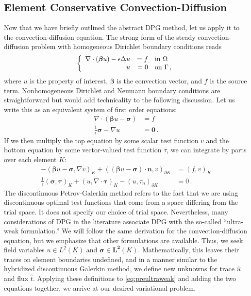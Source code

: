 \documentclass[letterpaper]{article}
\def\btau{\boldsymbol\tau}
\def\bsigma{\boldsymbol\sigma}
\def\bbeta{\boldsymbol\beta}
\newcommand{\bs}[1]{\boldsymbol{#1}}
\newcommand{\eqnref}[1]{\eqref{eq:#1}}
\newcommand{\mb}[1]{\mathbf{#1}}
\newcommand{\del}{\Delta}
\newcommand{\grad}{\nabla}
\renewcommand{\div}{\grad \cdot}
\begin{document}
\subsection{Element Conservative Convection-Diffusion}
Now that we have briefly outlined the abstract DPG method, let us apply it to
the convection-diffusion equation. The strong form of the steady
convection-diffusion problem with homogeneous Dirichlet boundary conditions reads
\[
\left\{
\begin{array}[c]{rrl}
\div(\bs\beta u)-\epsilon\del u & =f & \text{in }\Omega\\
u & =0 & \text{on }\Gamma\,,
\end{array}
\right.
\]
where $u$ is the property of interest, $\bs\beta$ is the convection vector,
and $f$ is the source term. Nonhomogeneous Dirichlet and Neumann boundary
conditions are straightforward but would add technicality to the following
discussion. Let us write this as an equivalent system of first
order equations:
\begin{align*}
\div(\bs\beta u-\bs\sigma)&=f\\
\frac{1}{\epsilon}\bs\sigma-\grad u&=\bs0\,.
\end{align*}
If we then multiply the top equation by some scalar test function $v$ and the
bottom equation by some vector-valued test function $\tau$, we can integrate by
parts over each element $K$:
\begin{equation}
\label{eq:preultraweak}
\begin{aligned}
-(\bbeta u-\bsigma,\nabla v)_K+((\bbeta
u-\bsigma)\cdot\mathbf{n},v)_{\partial K}&=(f,v)_K\\
\frac{1}{\epsilon}(\bsigma,\btau)_K+(u,\nabla\cdot\btau)_K
-(u,\tau_n)_{\partial K}&=0\,.
\end{aligned}
\end{equation}
The discontinuous Petrov-Galerkin method refers to the fact that we are using
discontinuous optimal test functions that come from a space differing from the
trial space. It does not specify our choice of trial space. Nevertheless, many
considerations of DPG in the literature \cite{} associate DPG with the
so-called ``ultra-weak formulation.'' We will follow the same derivation for
the convection-diffusion equation, but we emphasize that other formulations
are available. Thus, we seek field variables $u\in L^2(K)$ and
$\bsigma\in\mb{L^2}(K)$. Mathematically, this leaves their traces on element
boundaries undefined, and in a manner similar to the hybridized discontinuous
Galerkin method, we define new unknowns for trace $\hat u$ and flux $\hat t$.
Applying these definitions to \eqnref{preultraweak} and adding the two
equations together, we arrive at our desired variational problem. 
\end{document}
